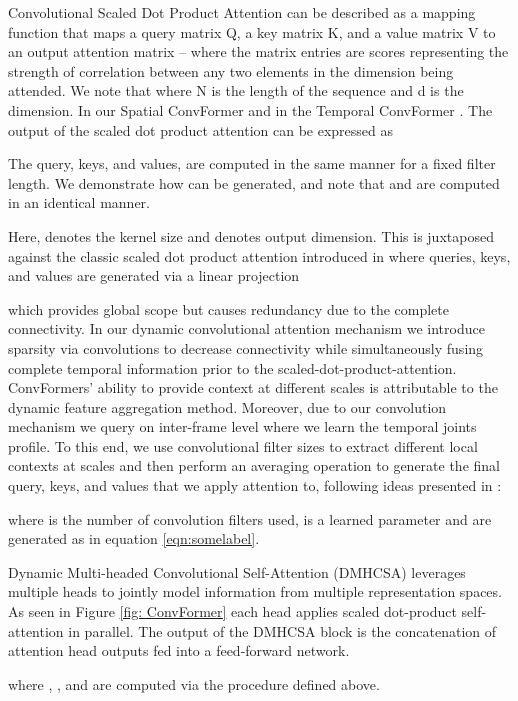 \documentclass{article}
\begin{document}
Convolutional Scaled Dot Product Attention can be described as a mapping function that maps a query matrix Q, a key matrix K, and a value matrix V to an output attention matrix -- where the matrix entries are scores representing the strength of correlation between any two elements in the dimension being attended. We note that  where N is the length of the sequence and d is the dimension. In our Spatial ConvFormer  and in the Temporal ConvFormer . The output of the scaled dot product attention can be expressed as 




The query, keys, and values, are computed in the same manner for a fixed filter length.  We demonstrate how  can be generated, and note that  and  are computed in an identical manner.


Here,  denotes the kernel size and  denotes output dimension. This is juxtaposed  against the classic scaled dot product attention introduced in \cite{VSPUJGKP17} where queries, keys, and values are generated via a linear projection 

which provides global scope but causes redundancy due to the complete connectivity. In our dynamic convolutional attention mechanism we introduce sparsity via convolutions to decrease connectivity while simultaneously fusing complete temporal information prior to the scaled-dot-product-attention. ConvFormers' ability to provide context at different scales is attributable to the dynamic feature aggregation method. Moreover, due to our convolution mechanism we query on inter-frame level where we learn the temporal joints profile. 
To this end, we use  convolutional filter sizes to extract different local contexts at scales  and then perform an averaging operation to generate the final query, keys, and values that we apply attention to, following ideas presented in \cite{ZKLOT16}:

where  is the number of convolution filters used,  is a learned parameter and  are generated as in equation \ref{eqn:somelabel}. 


Dynamic Multi-headed Convolutional Self-Attention (DMHCSA) leverages  multiple heads to jointly model information from multiple representation spaces. As seen in Figure \ref{fig: ConvFormer} each head applies scaled dot-product self-attention in parallel. The output of the DMHCSA block is the concatenation of  attention head outputs fed into a feed-forward network.

where  , , and  are computed via the procedure defined above. 
\end{document}
